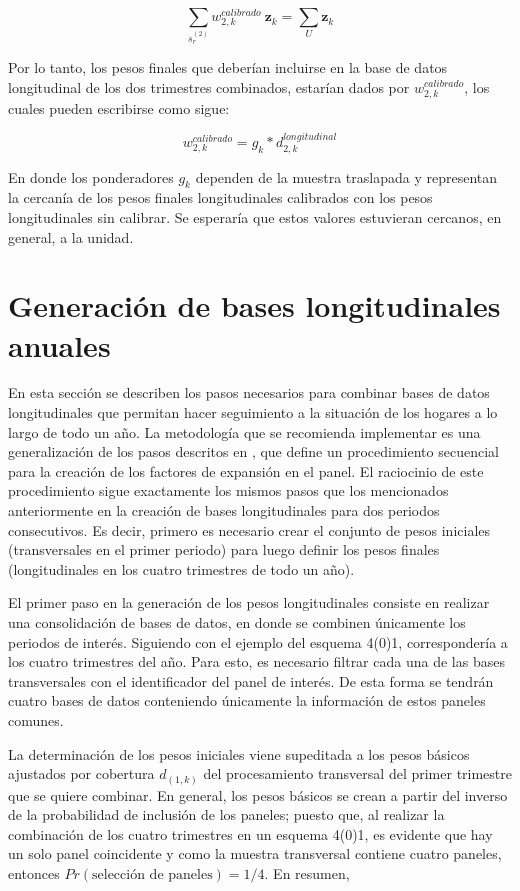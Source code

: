 \documentclass[
  12pt,
]{book}
\begin{document}
\[
\sum_{s_r^{(2)}} w_{2, k}^{calibrado} \  \mathbf{z}_k = \sum_{U} \mathbf{z}_k
\]

Por lo tanto, los pesos finales que deberían incluirse en la base de datos longitudinal de los dos trimestres combinados, estarían dados por \(w_{2, k}^{calibrado}\), los cuales pueden escribirse como sigue:

\[
w_{2, k}^{calibrado} = g_k * d_{2, k}^{longitudinal}
\]

En donde los ponderadores \(g_k\) dependen de la muestra traslapada y representan la cercanía de los pesos finales longitudinales calibrados con los pesos longitudinales sin calibrar. Se esperaría que estos valores estuvieran cercanos, en general, a la unidad.

\hypertarget{generaciuxf3n-de-bases-longitudinales-anuales}{%
\section{Generación de bases longitudinales anuales}\label{generaciuxf3n-de-bases-longitudinales-anuales}}

En esta sección se describen los pasos necesarios para combinar bases de datos longitudinales que permitan hacer seguimiento a la situación de los hogares a lo largo de todo un año. La metodología que se recomienda implementar es una generalización de los pasos descritos en \citet{Verma_Betti_Ghellini}, que define un procedimiento secuencial para la creación de los factores de expansión en el panel. El raciocinio de este procedimiento sigue exactamente los mismos pasos que los mencionados anteriormente en la creación de bases longitudinales para dos periodos consecutivos. Es decir, primero es necesario crear el conjunto de pesos iniciales (transversales en el primer periodo) para luego definir los pesos finales (longitudinales en los cuatro trimestres de todo un año).

El primer paso en la generación de los pesos longitudinales consiste en realizar una consolidación de bases de datos, en donde se combinen únicamente los periodos de interés. Siguiendo con el ejemplo del esquema 4(0)1, correspondería a los cuatro trimestres del año. Para esto, es necesario filtrar cada una de las bases transversales con el identificador del panel de interés. De esta forma se tendrán cuatro bases de datos conteniendo únicamente la información de estos paneles comunes.

La determinación de los pesos iniciales viene supeditada a los pesos básicos ajustados por cobertura \(d_{(1,k)}\) del procesamiento transversal del primer trimestre que se quiere combinar. En general, los pesos básicos se crean a partir del inverso de la probabilidad de inclusión de los paneles; puesto que, al realizar la combinación de los cuatro trimestres en un esquema 4(0)1, es evidente que hay un solo panel coincidente y como la muestra transversal contiene cuatro paneles, entonces \(Pr(\text{selección de paneles}) = 1/4\). En resumen,
\end{document}
